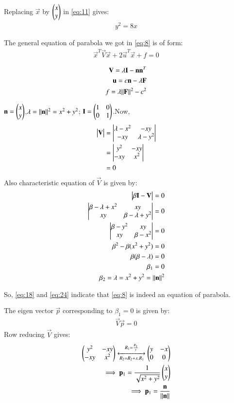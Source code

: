 \documentclass[journal,12pt,twocolumn]{IEEEtran}
\begin{document}
Replacing $\vec{x}$ by $\begin{pmatrix}x\\y\end{pmatrix}$ in \eqref{eq:11} gives:
\begin{align}
y^2=8x
\end{align}

The general equation of parabola we got in \eqref{eq:8} is of form:
\begin{align}
\vec{x}^T\vec{V}\vec{x}+2\vec{u}^T\vec{x}+f=0
\end{align}

\begin{align}
\mathbf{V}=\lambda\mathbf{I}-\mathbf{n}\mathbf{n}^T\\
\mathbf{u}=c\mathbf{n}-\lambda\mathbf{F}\\
f=\lambda\Vert\mathbf{F}\rVert^2-c^2
\end{align}

$\mathbf{n}=\begin{pmatrix}x\\y\end{pmatrix}$,$\lambda=\Vert\mathbf{n}\rVert^2=x^2+y^2$; $\mathbf{I}=\begin{pmatrix}1&0\\0&1\end{pmatrix}$.Now,
\begin{align}
\begin{vmatrix}\mathbf{V}\end{vmatrix}&=\begin{vmatrix}\lambda-x^2&-xy\\-xy&\lambda-y^2\end{vmatrix}\\
&=\begin{vmatrix}y^2&-xy\\-xy&x^2\end{vmatrix}\\
&=0\label{eq:18}
\end{align}
Also characteristic equation of $\vec{V}$ is given by:
\begin{align}
\begin{vmatrix}\beta\mathbf{I}-\mathbf{V}\end{vmatrix}=0\\
\begin{vmatrix}\beta-\lambda+x^2&xy\\xy&\beta-\lambda+y^2\end{vmatrix}=0\\
\begin{vmatrix}\beta-y^2&xy\\xy&\beta-x^2\end{vmatrix}=0\\
\beta^2-\beta(x^2+y^2)=0\\
\beta(\beta-\lambda)=0\\
\beta_{1}=0\label{eq:24}\\
\beta_{2}=\lambda=x^2+y^2=\Vert\mathbf{n}\rVert^2
\end{align}

So, \eqref{eq:18} and \eqref{eq:24} indicate that \eqref{eq:8} is indeed an equation of parabola.

The eigen vector $\vec{p}$ corresponding to $\beta_{1}=0$ is given by:
\begin{align}
\vec{V}\vec{p}=0
\end{align}
Row reducing $\vec{V}$ gives:
\begin{align}
\begin{pmatrix}y^2&-xy\\-xy&x^2\end{pmatrix}\xleftrightarrow[R_2=R_2+x.R_1]{R_1=\frac{R_1}{y}}\begin{pmatrix}y&-x\\0&0\end{pmatrix}\\
\implies\mathbf{p}_{1}=\frac{1}{\sqrt{x^2+y^2}}\begin{pmatrix}x\\y\end{pmatrix}\\
\implies\mathbf{p}_{1}=\frac{\mathbf{n}}{\Vert\mathbf{n}\rVert}
\end{align}
\end{document}
